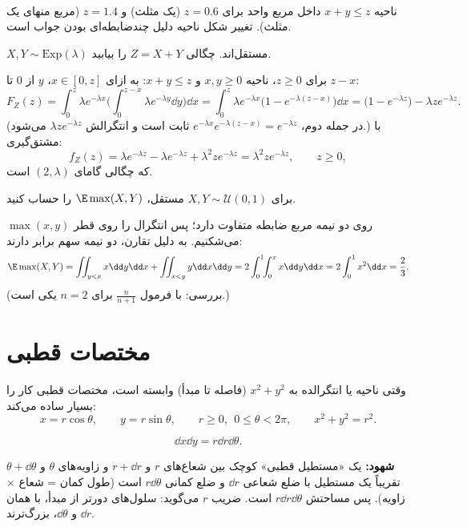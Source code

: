 \begin{center}
\begin{tikzpicture}
\end{tikzpicture}\\
{\small ناحیه $x+y\le z$ داخل مربع واحد برای $z=0.6$ (یک مثلث) و $z=1.4$ (مربع منهای یک مثلث). تغییر شکل ناحیه دلیل چندضابطه‌ای بودن جواب است.}
\end{center}

\begin{example}
$X,Y\sim\mathrm{Exp}(\lambda)$ مستقل‌اند. چگالی $Z=X+Y$ را بیابید.
\begin{solution}
برای $z\ge0$، ناحیه $x,y\ge0$ و $x+y\le z$: به ازای $x\in[0,z]$، $y$ از $0$ تا $z-x$:
\[
F_Z(z)=\int_0^z\lambda e^{-\lambda x}\Big(\int_0^{z-x}\lambda e^{-\lambda y}\dd y\Big)\dd x=\int_0^z\lambda e^{-\lambda x}\big(1-e^{-\lambda(z-x)}\big)\dd x=\big(1-e^{-\lambda z}\big)-\lambda ze^{-\lambda z}.
\]
(در جمله دوم، $e^{-\lambda x}e^{-\lambda(z-x)}=e^{-\lambda z}$ ثابت است و انتگرالش $\lambda ze^{-\lambda z}$ می‌شود.) با مشتق‌گیری:
\[
f_Z(z)=\lambda e^{-\lambda z}-\lambda e^{-\lambda z}+\lambda^2ze^{-\lambda z}=\lambda^2ze^{-\lambda z},\qquad z\ge0,
\]
که چگالی گامای $(2,\lambda)$ است.
\end{solution}
\end{example}

\begin{example}
برای $X,Y\sim\mathcal U(0,1)$ مستقل، $\E\max(X,Y)$ را حساب کنید.
\begin{solution}
$\max(x,y)$ روی دو نیمه مربع ضابطه متفاوت دارد؛ پس انتگرال را روی قطر می‌شکنیم. به دلیل تقارن، دو نیمه سهم برابر دارند:
\[
\E\max(X,Y)=\iint_{y<x}x\dd y\dd x+\iint_{x<y}y\dd x\dd y=2\int_0^1\!\!\int_0^xx\dd y\dd x=2\int_0^1x^2\dd x=\frac23 .
\]
(بررسی: با فرمول $\frac{n}{n+1}$ برای $n=2$ یکی است.)
\end{solution}
\end{example}

\section{مختصات قطبی}
وقتی ناحیه یا انتگرالده به $x^2+y^2$ (فاصله تا مبدأ) وابسته است، مختصات قطبی کار را بسیار ساده می‌کند:
\[
x=r\cos\theta,\qquad y=r\sin\theta,\qquad r\ge0,\ \ 0\le\theta<2\pi,\qquad x^2+y^2=r^2 .
\]
\begin{theorem}
\[
\dd x\dd y=r\dd r\dd\theta .
\]
\end{theorem}
\textbf{شهود:} یک «مستطیل قطبی» کوچک بین شعاع‌های $r$ و $r+\dd r$ و زاویه‌های $\theta$ و $\theta+\dd\theta$ تقریباً یک مستطیل با ضلع شعاعی $\dd r$ و ضلع کمانی $r\dd\theta$ است (طول کمان = شعاع × زاویه). پس مساحتش $r\dd r\dd\theta$ است. ضریب $r$ می‌گوید: سلول‌های دورتر از مبدأ، با همان $\dd r$ و $\dd\theta$، بزرگ‌ترند.

